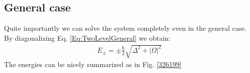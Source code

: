 \subsection{General case}

Quite importantly we can solve the system completely even in the general case. By diagonalizing  Eq. \eqref{Eq:TwoLevelGeneral} we obtain:
\begin{align}\label{eq:Epm}
 E_\pm = \pm \frac{\hbar}{2} \sqrt{\Delta^2+|\Omega|^2}
\end{align}
The energies can be nicely summarized as in Fig. \ref{326199}


